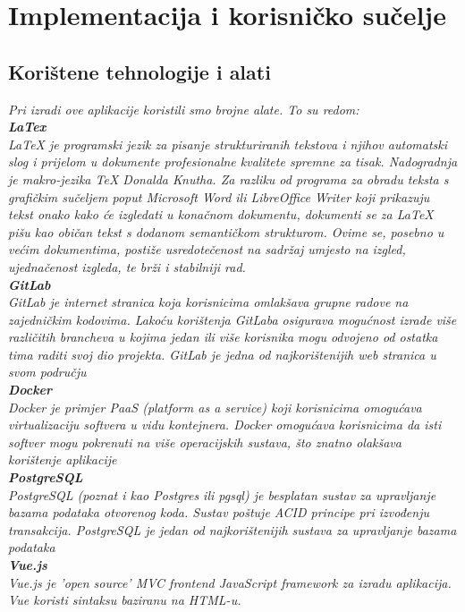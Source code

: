 \chapter{Implementacija i korisničko sučelje}
		
		
		\section{Korištene tehnologije i alati}
		
		\textit{Pri izradi ove aplikacije koristili smo brojne alate. To su redom: }\\
		\textbf{\textit{LaTex}}\\
		\textit{LaTeX je programski jezik za pisanje strukturiranih tekstova i njihov automatski slog i prijelom u dokumente profesionalne kvalitete spremne za tisak. Nadogradnja je makro-jezika TeX Donalda Knutha. Za razliku od programa za obradu teksta s grafičkim sučeljem poput Microsoft Word ili LibreOffice Writer koji prikazuju tekst onako kako će izgledati u konačnom dokumentu, dokumenti se za LaTeX pišu kao običan tekst s dodanom semantičkom strukturom. Ovime se, posebno u većim dokumentima, postiže usredotečenost na sadržaj umjesto na izgled, ujednačenost izgleda, te brži i stabilniji rad.}\\
		\textbf{\textit{GitLab}}\\
		\textit{GitLab je internet stranica koja korisnicima omlakšava grupne radove na zajedničkim kodovima. Lakoću korištenja GitLaba osigurava mogućnost izrade više različitih brancheva u kojima jedan ili više korisnika mogu odvojeno od ostatka tima raditi svoj dio projekta. GitLab je jedna od najkorištenijih web stranica u svom području}\\
		\textbf{\textit{Docker}}\\
		\textit{Docker je primjer PaaS (platform as a service) koji korisnicima omogućava virtualizaciju softvera u vidu kontejnera. Docker omogućava korisnicima da isti softver mogu pokrenuti na više operacijskih sustava, što znatno olakšava korištenje aplikacije}\\
		\textbf{\textit{PostgreSQL}}\\
		\textit{PostgreSQL (poznat i kao Postgres ili pgsql) je besplatan sustav za upravljanje bazama podataka otvorenog koda. Sustav poštuje ACID principe pri izvođenju transakcija. PostgreSQL je jedan od najkorištenijih sustava za upravljanje bazama podataka}\\
		\textbf{\textit{Vue.js}}\\
		\textit{Vue.js je 'open source' MVC frontend JavaScript framework za izradu aplikacija. Vue koristi sintaksu baziranu na HTML-u.}\\
	   \eject 
			
